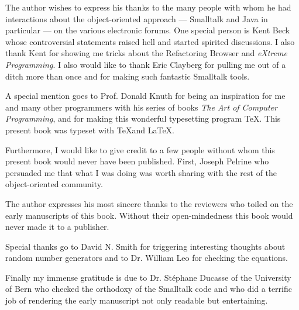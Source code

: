 \documentclass[twoside]{book}
\begin{document}
\begin{titlepage}
 The author wishes to express his
thanks to the many people with whom he had interactions about the
object-oriented approach --- Smalltalk and Java in particular ---
on the various electronic forums. One special person is Kent Beck
whose controversial statements raised hell and started spirited
discussions. I also thank Kent for showing me tricks about the
Refactoring Browser and {\sl eXtreme Programming}. I also would
like to thank Eric Clayberg for pulling me out of a ditch more
than once and for making such fantastic Smalltalk tools.

A special mention goes to Prof. Donald Knuth for being an
inspiration for me and many other programmers with his series of
books {\sl The Art of Computer Programming}, and for making this
wonderful typesetting program \TeX. This present book was typeset
with \TeX and \LaTeX.

Furthermore, I would like to give credit to a few people without
whom this present book would never have been published. First,
Joseph Pelrine who persuaded me that what I was doing was worth
sharing with the rest of the object-oriented community.

The author expresses his most sincere thanks to the reviewers who
toiled on the early manuscripts of this book. Without their
open-mindedness this book would never made it to a publisher.

Special thanks go to David N. Smith for triggering interesting
thoughts about random number generators and to Dr. William Leo for
checking the equations.

Finally my immense gratitude is due to Dr. St\'ephane Ducasse of the
University of Bern who checked the orthodoxy of the Smalltalk code
and who did a terrific job of rendering the early manuscript not
only readable but entertaining.

\vspace{5 ex}

\end{titlepage}
\ifx\wholebook\relax\else
\end{document}
